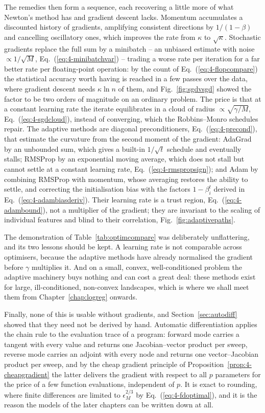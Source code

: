 The remedies then form a sequence, each recovering a little more of what
Newton's method has and gradient descent lacks.  Momentum accumulates a
discounted history of gradients, amplifying consistent directions by
$1/(1-\beta)$ and cancelling oscillatory ones, which improves the rate from
$\kappa$ to $\sqrt{\kappa}$.  Stochastic gradients replace the full sum by a
minibatch -- an unbiased estimate with noise $\propto1/\sqrt{M}$,
Eq.~(\ref{eq:4-minibatchvar}) -- trading a worse rate per iteration for a
far better rate per floating-point operation: by the count of
Eq.~(\ref{eq:4-flopcompare}) the statistical accuracy worth having is
reached in a few passes over the data, where gradient descent needs
$\kappa\ln n$ of them, and Fig.~\ref{fig:sgdvsgd} showed the factor to be
two orders of magnitude on an ordinary problem.  The price is that at a
constant learning rate the iterate equilibrates in a cloud of radius
$\propto\sqrt{\gamma/M}$, Eq.~(\ref{eq:4-sgdcloud}), instead of converging,
which the Robbins--Monro schedules repair.  The adaptive methods are
diagonal preconditioners, Eq.~(\ref{eq:4-precond}), that estimate the
curvature from the second moment of the gradient: AdaGrad by an unbounded
sum, which gives a built-in $1/\sqrt{t}$ schedule and eventually stalls;
RMSProp by an exponential moving average, which does not stall but cannot
settle at a constant learning rate, Eq.~(\ref{eq:4-rmspropsign}); and Adam
by combining RMSProp with momentum, whose averaging restores the ability to
settle, and correcting the initialisation bias with the factors
$1-\beta_i^{t}$ derived in Eq.~(\ref{eq:4-adambiasderiv}).  Their learning
rate is a trust region, Eq.~(\ref{eq:4-adambound}), not a multiplier of the
gradient; they are invariant to the scaling of individual features and blind
to their correlation, Fig.~\ref{fig:adaptivepaths}.

The demonstration of Table~\ref{tab:optimcompare} was deliberately
unflattering, and its two lessons should be kept.  A learning rate is not
comparable across optimisers, because the adaptive methods have already
normalised the gradient before $\gamma$ multiplies it.  And on a small, convex,
well-conditioned problem the adaptive machinery buys nothing and can cost a
great deal: these methods exist for large, ill-conditioned, non-convex
landscapes, which is where we shall meet them from Chapter~\ref{chap:logreg} onwards.

Finally, none of this is usable without gradients, and
Section~\ref{sec:autodiff} showed that they need not be derived by hand.
Automatic differentiation applies the chain rule to the evaluation trace of a
program: forward mode carries a tangent with every value and returns one
Jacobian--vector product per sweep, reverse mode carries an adjoint with
every node and returns one vector--Jacobian product per sweep, and by the
cheap gradient principle of Proposition~\ref{prop:4-cheapgradient} the latter
delivers the gradient with respect to all $p$ parameters for the price of a
few function evaluations, independent of $p$.  It is exact to rounding, where
finite differences are limited to $\epsilon_M^{2/3}$ by
Eq.~(\ref{eq:4-fdoptimal}), and it is the reason the models of the later
chapters can be written down at all.

